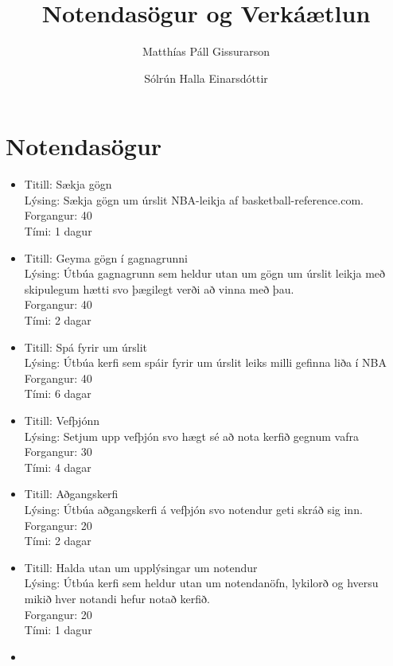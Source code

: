 \documentclass[a4paper,11pt]{article}
\title{Notendasögur og Verkáætlun} \author{Matthías Páll Gissurarson  \and Sólrún Halla Einarsdóttir}
\begin{document}
\maketitle
\section{Notendasögur}
\begin{itemize}
\item Titill: Sækja gögn\\
  Lýsing: Sækja gögn um úrslit NBA-leikja af basketball-reference.com.\\
  Forgangur: 40\\
  Tími: 1 dagur\\
\item
  Titill: Geyma gögn í gagnagrunni\\
  Lýsing: Útbúa gagnagrunn sem heldur utan um gögn um úrslit leikja með skipulegum hætti svo þægilegt verði að vinna með þau.\\
  Forgangur: 40\\
  Tími: 2 dagar\\
\item
  Titill: Spá fyrir um úrslit\\
  Lýsing: Útbúa kerfi sem spáir fyrir um úrslit leiks milli gefinna liða í NBA\\
  Forgangur: 40\\
  Tími: 6 dagar\\
\item
  Titill: Vefþjónn\\
  Lýsing: Setjum upp vefþjón svo hægt sé að nota kerfið gegnum vafra\\
  Forgangur: 30\\
  Tími: 4 dagar\\
\item
  Titill: Aðgangskerfi\\
  Lýsing: Útbúa aðgangskerfi á vefþjón svo notendur geti skráð sig inn.\\
  Forgangur: 20\\
  Tími: 2 dagar\\
\item
  Titill: Halda utan um upplýsingar um notendur\\
  Lýsing: Útbúa kerfi sem heldur utan um notendanöfn, lykilorð og hversu mikið hver notandi hefur notað kerfið.\\
  Forgangur: 20\\
  Tími: 1 dagur\\
\item

\end{itemize}
\end{document}
